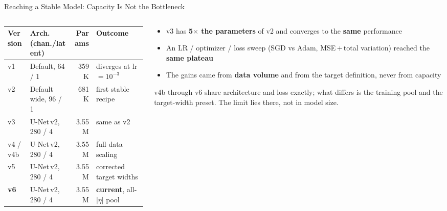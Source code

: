 \documentclass[xcolor=table,aspectratio=169]{beamer}
\begin{document}
\begin{frame}{Reaching a Stable Model: Capacity Is Not the Bottleneck}
    \begin{columns}[c]
        \begin{column}{0.62\linewidth}
            \centering
            \scriptsize
            \setlength{\tabcolsep}{3.5pt}
            \begin{tabular}{llrl}
                \toprule
                Version & Arch. (chan./latent) & Params & Outcome \\
                \midrule
                v1  & Default, 64 / 1     & 359K & diverges at lr$=10^{-3}$ \\
                v2  & Default wide, 96 / 1 & 681K & first stable recipe \\
                v3  & U-Net\,v2, 280 / 4  & 3.55M & same as v2 \\
                v4 / v4b  & U-Net\,v2, 280 / 4  & 3.55M & full-data scaling \\
                v5  & U-Net\,v2, 280 / 4 & 3.55M & corrected target widths \\
                \textbf{v6} & U-Net\,v2, 280 / 4 & 3.55M & \textbf{current}, all-$|\eta|$ pool \\
                \bottomrule
            \end{tabular}
        \end{column}
        \begin{column}{0.38\linewidth}
            \footnotesize
            \begin{itemize}\setlength\itemsep{0.35em}
                \item v3 has \textbf{5$\times$ the parameters} of v2 and converges to the \textbf{same} performance
                \item An LR / optimizer / loss sweep (SGD vs Adam, MSE\,$+$\,total variation) reached the \textbf{same plateau}
                \item The gains came from \textbf{data volume} and from the target definition, never from capacity
            \end{itemize}
            \vspace{0.4em}
            {\footnotesize\textcolor{black!55}{v4b through v6 share architecture and
            loss exactly; what differs is the training pool and the target-width
            preset. The limit lies there, not in model size.}}
        \end{column}
    \end{columns}
\end{frame}
\end{document}
